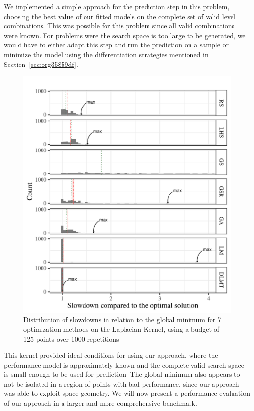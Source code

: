 \documentclass[conference]{IEEEtran}
\begin{document}
We  implemented a  simple  approach for  the prediction  step  in this  problem,
choosing the best value of our fitted  models on the complete set of valid level
combinations. This  was possible for  this problem since all  valid combinations
were known. For problems were the search  space is too large to be generated, we
would have  to either  adapt this  step and run  the prediction  on a  sample or
minimize   the  model   using  the   differentiation  strategies   mentioned  in
Section~\ref{sec:org35859df}.

\begin{figure}[t]\vspace{-.5cm}
\centering
\includegraphics[width=.9\columnwidth]{./img/comparison_histogram.pdf}
\caption{\label{fig:org6f6944c}
Distribution of slowdowns in relation to the global minimum for 7 optimization methods on the Laplacian Kernel, using a budget of 125 points over 1000 repetitions \vspace{-.5cm}}
\end{figure}

This  kernel  provided  ideal  conditions  for using  our  approach,  where  the
performance model is approximately known and  the complete valid search space is
small enough to be  used for prediction. The global minimum  also appears to not
be isolated in a  region of points with bad performance,  since our approach was
able to exploit space geometry. We  will now present a performance evaluation of
our approach in a larger and more comprehensive benchmark.
\end{document}
